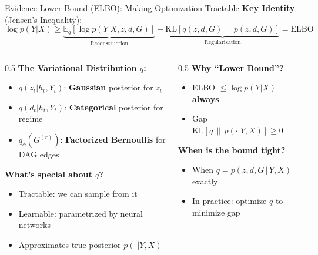 \documentclass[aspectratio=169]{beamer}
\begin{document}
\begin{frame}{Evidence Lower Bound (ELBO): Making Optimization Tractable}
\textbf{Key Identity} (Jensen's Inequality):
\begin{equation*}
\log p(Y|X) \geq \underbrace{\mathbb{E}_{q}[\log p(Y|X,z,d,G)]}_{\text{Reconstruction}} - \underbrace{\text{KL}[q(z,d,G) \,\|\, p(z,d,G)]}_{\text{Regularization}} = \text{ELBO}
\end{equation*}

\vspace{0.1cm}
\begin{columns}
\begin{column}{0.5\textwidth}
\textbf{The Variational Distribution $q$:}
\begin{itemize}
    \item $q(z_t | h_t, Y_t)$: \textbf{Gaussian} posterior for $z_t$
    \item $q(d_t | h_t, Y_t)$: \textbf{Categorical} posterior for regime
    \item $q_\phi(G^{(r)})$: \textbf{Factorized Bernoullis} for DAG edges
\end{itemize}

\vspace{0.1cm}
\textbf{What's special about $q$?}
\begin{itemize}
    \item Tractable: we can sample from it
    \item Learnable: parametrized by neural networks
    \item Approximates true posterior $p(\cdot | Y, X)$
\end{itemize}
\end{column}

\begin{column}{0.5\textwidth}
\textbf{Why ``Lower Bound''?}
\begin{itemize}
    \item ELBO $\leq \log p(Y|X)$ \textbf{always}
    \item Gap = $\text{KL}[q \,\|\, p(\cdot|Y,X)] \geq 0$
\end{itemize}

\vspace{0.1cm}
\textbf{When is the bound tight?}
\begin{itemize}
    \item When $q = p(z,d,G \,|\, Y,X)$ exactly
    \item In practice: optimize $q$ to minimize gap
\end{itemize}

\begin{center}
\end{center}
\end{column}
\end{columns}
\end{frame}
\end{document}
